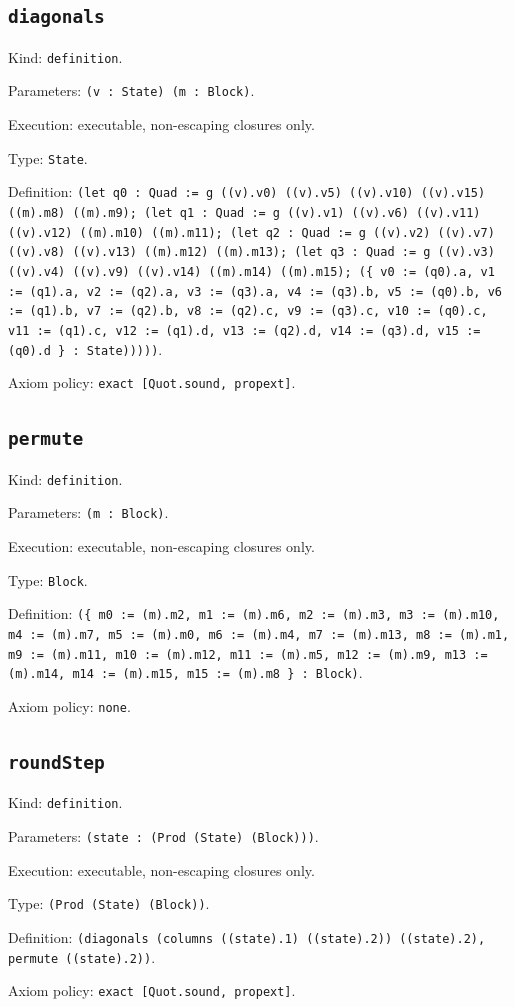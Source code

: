 \documentclass[11pt]{article}
\begin{document}
\subsection*{\texttt{diagonals}}
\noindent Kind: \texttt{definition}.\par
\noindent Parameters: \texttt{(v : State) (m : Block)}.\par
\noindent Execution: executable, non-escaping closures only.\par
\noindent Type: \texttt{State}.\par
\noindent Definition: \texttt{(let q0 : Quad := g ((v).v0) ((v).v5) ((v).v10) ((v).v15) ((m).m8) ((m).m9); (let q1 : Quad := g ((v).v1) ((v).v6) ((v).v11) ((v).v12) ((m).m10) ((m).m11); (let q2 : Quad := g ((v).v2) ((v).v7) ((v).v8) ((v).v13) ((m).m12) ((m).m13); (let q3 : Quad := g ((v).v3) ((v).v4) ((v).v9) ((v).v14) ((m).m14) ((m).m15); (\{ v0 := (q0).a, v1 := (q1).a, v2 := (q2).a, v3 := (q3).a, v4 := (q3).b, v5 := (q0).b, v6 := (q1).b, v7 := (q2).b, v8 := (q2).c, v9 := (q3).c, v10 := (q0).c, v11 := (q1).c, v12 := (q1).d, v13 := (q2).d, v14 := (q3).d, v15 := (q0).d \} : State)))))}.\par
\noindent Axiom policy: \texttt{exact [Quot.sound, propext]}.\par
\subsection*{\texttt{permute}}
\noindent Kind: \texttt{definition}.\par
\noindent Parameters: \texttt{(m : Block)}.\par
\noindent Execution: executable, non-escaping closures only.\par
\noindent Type: \texttt{Block}.\par
\noindent Definition: \texttt{(\{ m0 := (m).m2, m1 := (m).m6, m2 := (m).m3, m3 := (m).m10, m4 := (m).m7, m5 := (m).m0, m6 := (m).m4, m7 := (m).m13, m8 := (m).m1, m9 := (m).m11, m10 := (m).m12, m11 := (m).m5, m12 := (m).m9, m13 := (m).m14, m14 := (m).m15, m15 := (m).m8 \} : Block)}.\par
\noindent Axiom policy: \texttt{none}.\par
\subsection*{\texttt{roundStep}}
\noindent Kind: \texttt{definition}.\par
\noindent Parameters: \texttt{(state : (Prod (State) (Block)))}.\par
\noindent Execution: executable, non-escaping closures only.\par
\noindent Type: \texttt{(Prod (State) (Block))}.\par
\noindent Definition: \texttt{(diagonals (columns ((state).1) ((state).2)) ((state).2), permute ((state).2))}.\par
\noindent Axiom policy: \texttt{exact [Quot.sound, propext]}.\par
\end{document}
